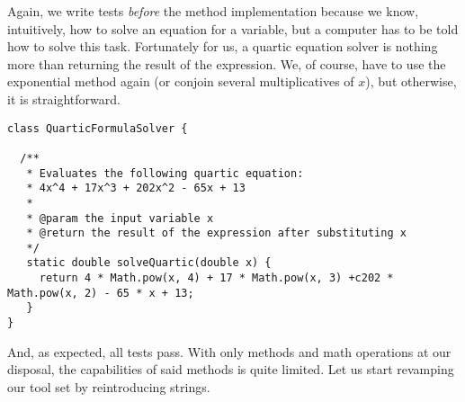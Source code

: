 Again, we write tests \textit{before} the method implementation because we know, intuitively, how to solve an equation for a variable, but a computer has to be told how to solve this task. Fortunately for us, a quartic equation solver is nothing more than returning the result of the expression. We, of course, have to use the exponential  method again (or conjoin several multiplicatives of $x$), but otherwise, it is straightforward.

\begin{cl}{}
\begin{lstlisting}[language=MyJava]
class QuarticFormulaSolver {

  /**
   * Evaluates the following quartic equation:
   * 4x^4 + 17x^3 + 202x^2 - 65x + 13
   *
   * @param the input variable x
   * @return the result of the expression after substituting x
   */
   static double solveQuartic(double x) {
     return 4 * Math.pow(x, 4) + 17 * Math.pow(x, 3) +c202 * Math.pow(x, 2) - 65 * x + 13;
   }
}
\end{lstlisting}
\end{cl}

And, as expected, all tests pass. With only methods and math operations at our disposal, the capabilities of said methods is quite limited. Let us start revamping our tool set by reintroducing strings.